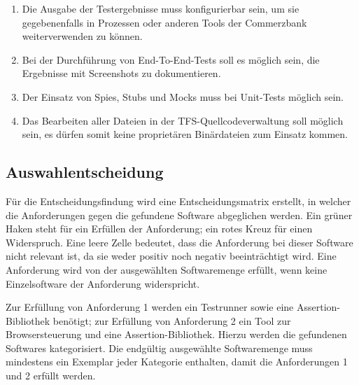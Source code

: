 \begin{enumerate}
	\item Die Ausgabe der Testergebnisse muss konfigurierbar sein, um sie gegebenenfalls in Prozessen oder anderen Tools der Commerzbank weiterverwenden zu können.
	\item Bei der Durchführung von End-To-End-Tests soll es möglich sein, die Ergebnisse mit Screenshots zu dokumentieren.
	\item Der Einsatz von Spies, Stubs und Mocks muss bei Unit-Tests möglich sein.
	\item Das Bearbeiten aller Dateien in der TFS-Quellcodeverwaltung soll möglich sein, es dürfen somit keine proprietären Binärdateien zum Einsatz kommen.
\end{enumerate}




\subsection{Auswahlentscheidung}
Für die Entscheidungsfindung wird eine Entscheidungsmatrix erstellt, in welcher die Anforderungen gegen die gefundene Software abgeglichen werden. Ein grüner Haken steht für ein Erfüllen der Anforderung; ein rotes Kreuz für einen Widerspruch. Eine leere Zelle bedeutet, dass die Anforderung bei dieser Software nicht relevant ist, da sie weder positiv noch negativ beeinträchtigt wird. Eine Anforderung wird von der ausgewählten Softwaremenge erfüllt, wenn keine Einzelsoftware der Anforderung widerspricht.

Zur Erfüllung von Anforderung 1 werden ein Testrunner sowie eine Assertion-Bibliothek benötigt; zur Erfüllung von Anforderung 2 ein Tool zur Browsersteuerung und eine Assertion-Bibliothek. Hierzu werden die gefundenen Softwares  kategorisiert. Die endgültig ausgewählte Softwaremenge muss mindestens ein Exemplar jeder Kategorie enthalten, damit die Anforderungen 1 und 2 erfüllt werden.

